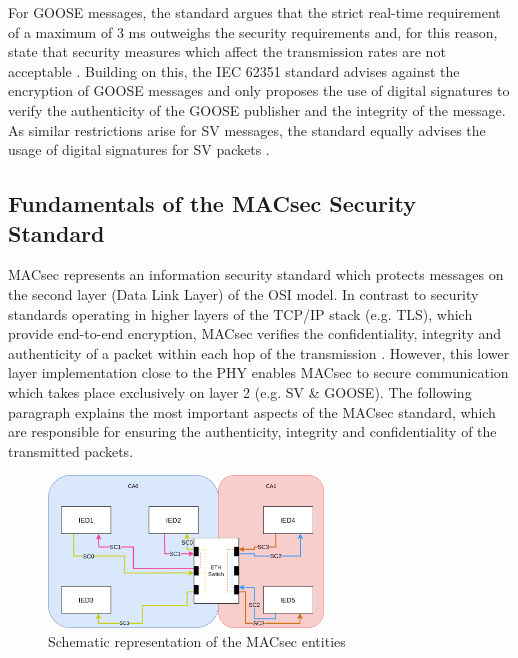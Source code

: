 \documentclass[conference, onecolumn, a4paper]{IEEEtran}
\begin{document}
\smallskip
For GOOSE messages, the standard argues that the strict real-time requirement of a maximum of 3 ms \cite{GOOSE_confidentiality_integrity:2020} outweighs 
the security requirements and, for this reason, state that security measures which affect the transmission rates are not acceptable \cite{PoisonedGOOSE:2014}. 
Building on this, the IEC 62351 standard advises against the encryption of GOOSE messages and only proposes the use of digital signatures to verify the 
authenticity of the GOOSE publisher and the integrity of the message. As similar restrictions arise for SV messages, the standard equally advises the 
usage of digital signatures for SV packets \cite{Review_IEC62351:2019}. 

\subsection{Fundamentals of the MACsec Security Standard}
\noindent MACsec represents an information security standard which protects messages on the second layer (Data Link Layer) of the OSI model. In contrast 
to security standards operating in higher layers of the TCP/IP stack (e.g. TLS), which provide end-to-end encryption, MACsec verifies the confidentiality, 
integrity and authenticity of a packet within each hop of the transmission \cite{Cybersecurity_Substation:2016}. However, this lower layer implementation 
close to the PHY enables MACsec to secure communication which takes place exclusively on layer 2 (e.g. SV \& GOOSE). The following paragraph explains the 
most important aspects of the MACsec standard, which are responsible for ensuring the authenticity, integrity and confidentiality of the transmitted packets.

\begin{figure}[h]
    \centering
    \includegraphics[width=0.65\textwidth]{images/MACsec_Entities_Diagram.png}
    \caption{Schematic representation of the MACsec entities \cite{IEEE-802-1AE:2018}}
    \label{image:MACsecEntities}
\end{figure}
\end{document}
